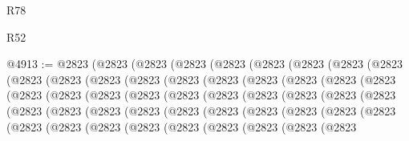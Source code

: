 \begin{lexlean}{R78}
\begin{lexlean}{R52}
\begin{coremodule}
{{{{{{{{{{{{{{{{{{{{{{{{{{{{{{{{{{{{{{{{{{{{{{{{{{{{{{{{{{{{{{{{{{{{{{{{{{{{{{{{{{{{{{{{{{{{{{{{{{{{{{{{{{{{{{{{{{{{{{{{{{{{{{{{{{{{{{{{{{{{{{{{{{{{{{{{{{{{{{{{{{{{{{{{{{{{{{{{{{{{{{{{{{{{{{{{{{{{{{@4913 := @2823
    (@2823
      (@2823
        (@2823
          (@2823
            (@2823
              (@2823
                (@2823
                  (@2823
                    (@2823
                      (@2823
                        (@2823
                          (@2823
                            (@2823
                              (@2823
                                (@2823
                                  (@2823
                                    (@2823
                                      (@2823
                                        (@2823
                                          (@2823
                                            (@2823
                                              (@2823
                                                (@2823
                                                  (@2823
                                                    (@2823
                                                      (@2823
                                                        (@2823
                                                          (@2823
                                                            (@2823
                                                              (@2823
                                                                (@2823
                                                                  (@2823
                                                                    (@2823
                                                                      (@2823
                                                                        (@2823
                                                                          (@2823
                                                                            (@2823
                                                                              (@2823
                                                                                (@2823
                                                                                  (@2823
                                                                                    (@2823
                                                                                      (@2823
                                                                                        (@2823
                                                                                          (@2823
                                                                                            (@2823
                                                                                              (@2823
                                                                                                (@2823
}}}}}}}}}}}}}}}}}}}}}}}}}}}}}}}}}}}}}}}}}}}}}}}}}}}}}}}}}}}}}}}}}}}}}}}}}}}}}}}}}}}}}}}}}}}}}}}}}}}}}}}}}}}}}}}}}}}}}}}}}}}}}}}}}}}}}}}}}}}}}}}}}}}}}}}}}}}}}}}}}}}}}}}}}}}}}}}}}}}}}}}}}}}}}}}}}}}}}}
\end{coremodule}
\end{lexlean}
\end{lexlean}
